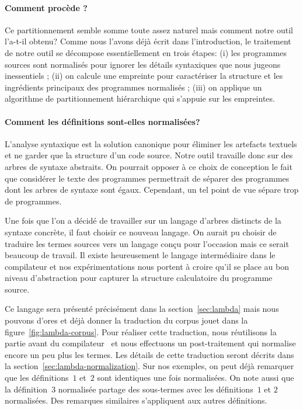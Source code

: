 \paragraph{Comment procède {\Asak}?}
Ce partitionnement semble somme toute assez naturel mais comment notre
outil l'a-t-il obtenu? Comme nous l'avons déjà écrit dans
l'introduction, le traitement de notre outil se décompose
essentiellement en trois étapes: (i) les programmes sources sont
normalisés pour ignorer les détails syntaxiques que nous jugeons
inessentiels ; (ii) on calcule une empreinte pour caractériser la
structure et les ingrédients principaux des programmes normalisés ;
(iii) on applique un algorithme de partitionnement hiérarchique qui
s'appuie sur les empreintes.

\paragraph{Comment les définitions sont-elles normalisées?}
L'analyse syntaxique est la solution canonique pour éliminer les
artefacts textuels et ne garder que la structure d'un code source.
Notre outil travaille donc sur des arbres de syntaxe abstraits.  On
pourrait opposer à ce choix de conception le fait que considérer le
texte des programmes permettrait de séparer des programmes dont les
arbres de syntaxe sont égaux. Cependant, un tel point de vue sépare
trop de programmes.

Une fois que l'on a décidé de travailler sur un langage d'arbres
distincts de la syntaxe concrète, il faut choisir ce nouveau langage.
On aurait pu choisir de traduire les termes sources vers un langage
conçu pour l'occasion mais ce serait beaucoup de travail. Il existe
heureusement le langage intermédiaire {\LambdaCode} dans le
compilateur et nos expérimentations nous portent à croire qu'il se
place au bon niveau d'abstraction pour capturer la structure
calculatoire du programme source.

Ce langage sera présenté précisément dans la section~\ref{sec:lambda}
mais nous pouvons d'ores et déjà donner la traduction du corpus jouet
dans la figure~\ref{fig:lambda-corpus}. Pour réaliser cette
traduction, nous réutilisons la partie avant du compilateur~{\OCaml}
et nous effectuons un post-traitement qui normalise encore un peu plus
les termes. Les détails de cette traduction seront décrits dans la
section~\ref{sec:lambda-normalization}. Sur nos exemples, on peut déjà
remarquer que les définitions~$1$ et~$2$ sont identiques une fois
normalisées. On note aussi que la définition~$3$ normalisée partage
des sous-termes avec les définitions~$1$ et $2$ normalisées. Des
remarques similaires s'appliquent aux autres définitions.

